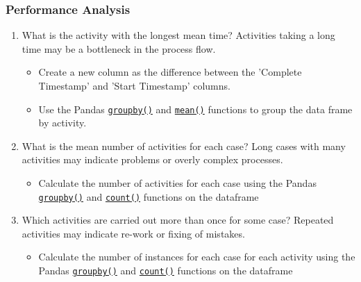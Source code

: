 \begin{exercisebox}

\subsubsection*{Performance Analysis}

\begin{enumerate}
   \item What is the activity with the longest mean time? Activities taking a long time may be a bottleneck in the process flow.
   \begin{itemize}
       \item Create a new column as the difference between the 'Complete Timestamp' and 'Start Timestamp' columns.
       \item Use the Pandas \href{https://pandas.pydata.org/docs/reference/api/pandas.DataFrame.groupby.html}{\texttt{groupby()}} and \href{https://pandas.pydata.org/docs/reference/api/pandas.DataFrame.mean.html}{\texttt{mean()}} functions to group the data frame by activity.
   \end{itemize}
   \item What is the mean number of activities for each case? Long cases with many activities may indicate problems or overly complex processes.
   \begin{itemize}
       \item Calculate the number of activities for each case using the Pandas \href{https://pandas.pydata.org/docs/reference/api/pandas.DataFrame.groupby.html}{\texttt{groupby()}} and \href{https://pandas.pydata.org/docs/reference/api/pandas.DataFrame.count.html}{\texttt{count()}} functions on the dataframe
   \end{itemize}
   \item Which activities are carried out more than once for some case? Repeated activities may indicate re-work or fixing of mistakes.
   \begin{itemize}
       \item Calculate the number of instances for each case for each activity using the Pandas \href{https://pandas.pydata.org/docs/reference/api/pandas.DataFrame.groupby.html}{\texttt{groupby()}} and \href{https://pandas.pydata.org/docs/reference/api/pandas.DataFrame.count.html}{\texttt{count()}} functions on the dataframe
   \end{itemize}
\end{enumerate}
\end{exercisebox}


